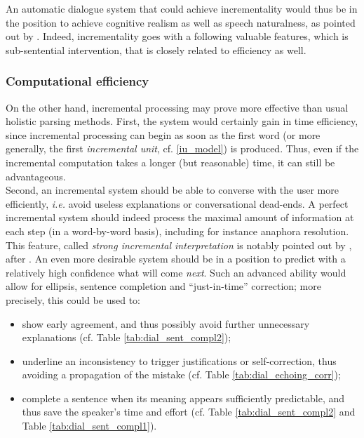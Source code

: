\documentclass[11pt]{article}
\begin{document}
				
				
				
				
				An automatic dialogue system that could achieve incrementality would thus be in the position to achieve cognitive realism as well as speech naturalness, as pointed out by \cite{schlangen2009}. Indeed, incrementality goes with a following valuable features, which is sub-sentential intervention, that is closely related to efficiency as well.

			\subsubsection{Computational efficiency}
				On the other hand, incremental processing may prove more effective than usual holistic parsing methods. First, the system would certainly gain in time efficiency, since incremental processing can begin as soon as the first word (or more generally, the first \textit{incremental unit}, cf. \ref{iu_model}) is produced. Thus, even if the incremental computation takes a longer (but reasonable) time, it can still be advantageous.\\
				
				Second, an incremental system should be able to converse with the user more efficiently, \textit{i.e.} avoid useless explanations or conversational dead-ends. A perfect incremental system should indeed process the maximal amount of information at each step (in a word-by-word basis), including for instance anaphora resolution. This feature, called \textit{strong incremental interpretation} is notably pointed out by \cite{hough2015}, after \cite{milward1991}.  An even more desirable system should be in a position to predict with a relatively high confidence what will come \textit{next}. Such an advanced ability would allow for ellipsis, sentence completion and ``just-in-time'' correction; more precisely, this could be used to:
				\begin{itemize}
					\item show early agreement, and thus possibly avoid further unnecessary explanations (cf. Table \ref{tab:dial_sent_compl2});
				 	\item underline an inconsistency to trigger justifications or self-correction, thus avoiding a propagation of the mistake (cf. Table \ref{tab:dial_echoing_corr});
				 	\item complete a sentence when its meaning appears sufficiently predictable, and thus save the speaker's time and effort (cf. Table \ref{tab:dial_sent_compl2} and Table \ref{tab:dial_sent_compl1}).
				\end{itemize}
				
\end{document}
